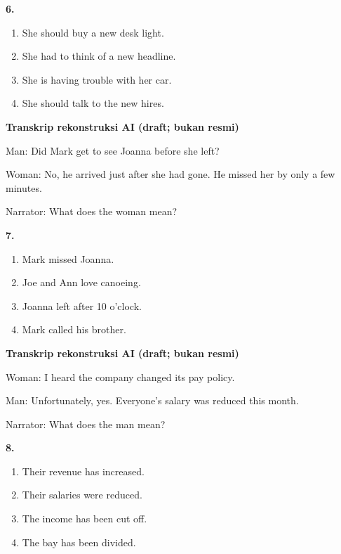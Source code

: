 \documentclass[12pt]{article}
\begin{document}
\noindent\textbf{6.}
\begin{enumerate}[label=(\Alph*),leftmargin=*,itemsep=0.2em]
\item She should buy a new desk light.
\item She had to think of a new headline.
\item She is having trouble with her car.
\item She should talk to the new hires.
\end{enumerate}
\par
\vspace{0.25\baselineskip}
\begin{exampleblock}
\textbf{Transkrip rekonstruksi AI (draft; bukan resmi)}\par
Man: Did Mark get to see Joanna before she left?\par
Woman: No, he arrived just after she had gone. He missed her by only a few minutes.\par
Narrator: What does the woman mean?\par
\end{exampleblock}
\noindent\textbf{7.}
\begin{enumerate}[label=(\Alph*),leftmargin=*,itemsep=0.2em]
\item Mark missed Joanna.
\item Joe and Ann love canoeing.
\item Joanna left after 10 o'clock.
\item Mark called his brother.
\end{enumerate}
\par
\vspace{0.25\baselineskip}
\begin{exampleblock}
\textbf{Transkrip rekonstruksi AI (draft; bukan resmi)}\par
Woman: I heard the company changed its pay policy.\par
Man: Unfortunately, yes. Everyone's salary was reduced this month.\par
Narrator: What does the man mean?\par
\end{exampleblock}
\noindent\textbf{8.}
\begin{enumerate}[label=(\Alph*),leftmargin=*,itemsep=0.2em]
\item Their revenue has increased.
\item Their salaries were reduced.
\item The income has been cut off.
\item The bay has been divided.
\end{enumerate}
\end{document}

